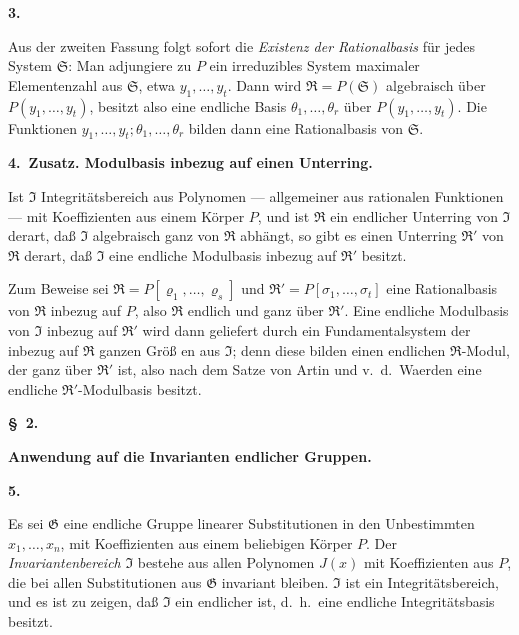 \documentclass[12pt,a4paper]{article}
\begin{document}
{{\medskip
\noindent\textbf{3.}

Aus der zweiten Fassung folgt sofort die \textit{Existenz der Rationalbasis}
f\"{u}r jedes System $\mathfrak{S}$: Man adjungiere zu $P$ ein irreduzibles System maximaler
Elementenzahl aus $\mathfrak{S}$, etwa $y_{1},\dots,y_{t}$. Dann wird $\mathfrak{R}=P(\mathfrak{S})$ algebraisch
\"{u}ber $P(y_{1},\dots,y_{t})$, besitzt also eine endliche Basis $\theta_{1},\dots,\theta_{r}$
\"{u}ber $P(y_{1},\dots,y_{t})$. Die Funktionen $y_{1},\dots,y_{t};\theta_{1},\dots,\theta_{r}$
bilden dann eine Rationalbasis von $\mathfrak{S}$.

\medskip
\noindent\textbf{4.\ Zusatz. Modulbasis inbezug auf einen Unterring.}

Ist $\mathfrak{I}$ Integrit\"{a}tsbereich aus Polynomen --- allgemeiner aus rationalen
Funktionen --- mit Koeffizienten aus einem K\"{o}rper $P$, und ist $\mathfrak{R}$ ein
endlicher Unterring von $\mathfrak{I}$ derart, da{\ss} $\mathfrak{I}$ algebraisch ganz von $\mathfrak{R}$ abh\"{a}ngt,
so gibt es einen Unterring $\mathfrak{R}'$ von $\mathfrak{R}$ derart, da{\ss} $\mathfrak{I}$ eine endliche
Modulbasis inbezug auf $\mathfrak{R}'$ besitzt.

Zum Beweise sei $\mathfrak{R}=P[\varrho_{1},\dots,\varrho_{s}]$ und $\mathfrak{R}'=P[\sigma_{1},\dots,\sigma_{t}]$
eine Rationalbasis von $\mathfrak{R}$ inbezug auf $P$, also $\mathfrak{R}$ endlich und ganz
\"{u}ber $\mathfrak{R}'$. Eine endliche Modulbasis von $\mathfrak{I}$ inbezug auf $\mathfrak{R}'$ wird dann
geliefert durch ein Fundamentalsystem der inbezug auf $\mathfrak{R}$ ganzen
Gr\"{o}{\ss} en aus $\mathfrak{I}$; denn diese bilden einen endlichen $\mathfrak{R}$-Modul, der ganz
\"{u}ber $\mathfrak{R}'$ ist, also nach dem Satze von Artin und v.~d.~Waerden eine
endliche $\mathfrak{R}'$-Modulbasis besitzt.

\medskip
\noindent\textbf{\S~2.}
\medskip

\noindent\textbf{Anwendung auf die Invarianten endlicher Gruppen.}
\medskip

\textbf{5.}

Es sei $\mathfrak{G}$ eine endliche Gruppe linearer Substitutionen in den Unbestimmten
$x_{1},\dots,x_{n}$, mit Koeffizienten aus einem beliebigen K\"{o}rper $P$.
Der \textit{Invariantenbereich} $\mathfrak{I}$ bestehe aus allen Polynomen $J(x)$ mit Koeffizienten
aus $P$, die bei allen Substitutionen aus $\mathfrak{G}$ invariant bleiben.
$\mathfrak{I}$ ist ein Integrit\"{a}tsbereich, und es ist zu zeigen, da{\ss} $\mathfrak{I}$ ein endlicher
ist, d.~h.\ eine endliche Integrit\"{a}tsbasis besitzt.

}}
\end{document}
